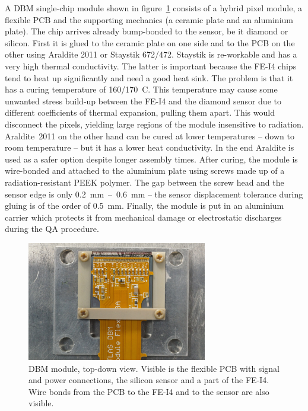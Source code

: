 A DBM single-chip module shown in figure~\ref{fig:completedmod} consists of a hybrid pixel module, a flexible PCB and the supporting mechanics (a ceramic plate and an aluminium plate). The chip arrives already bump-bonded to the sensor, be it diamond or silicon. First it is glued to the ceramic plate on one side and to the PCB on the other using Araldite 2011 or Staystik 672/472. 
Staystik is re-workable and has a very high thermal conductivity. The latter is important because the FE-I4 chips tend to heat up significantly and need a good heat sink. The problem is that it has a curing temperature of 160/170~\textdegree C. This temperature may cause some unwanted stress build-up between the FE-I4 and the diamond sensor due to different coefficients of thermal expansion, pulling them apart. This would disconnect the pixels, yielding large regions of the module insensitive to radiation. Araldite~2011 on the other hand can be cured at lower temperatures -- down to room temperature -- but it has a lower heat conductivity. In the end Araldite is used as a safer option despite longer assembly times. After curing, the module is wire-bonded and attached to the aluminium plate using screws made up of a radiation-resistant PEEK polymer. The gap between the screw head and the sensor edge is only 0.2~mm~--~0.6~mm -- the sensor displacement tolerance during gluing is of the order of 0.5~mm. Finally, the module is put in an aluminium carrier which protects it from mechanical damage or electrostatic discharges during the QA procedure.


\begin{figure}[!t]
\centering
\includegraphics[width=0.7\textwidth]{04_charge_monitoring/pics/mod1}
\caption{DBM module, top-down view. Visible is the flexible PCB with signal and power connections, the silicon sensor and a part of the FE-I4. Wire bonds from the PCB to the FE-I4 and to the sensor are also visible.}
\label{fig:completedmod}
\end{figure}




